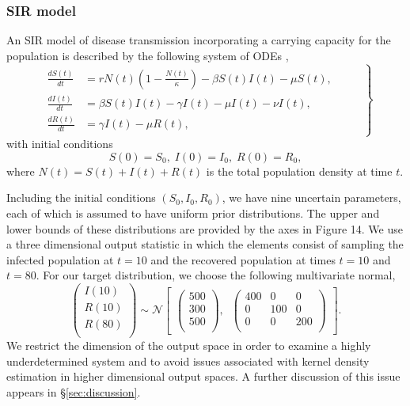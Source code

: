 \documentclass[10pt,letterpaper]{article}
\begin{document}
\vspace{0.5cm}

\subsubsection{SIR model}
\label{sec:SIR}

An SIR model of disease transmission incorporating a carrying capacity for the population is described by the following system of ODEs \cite{tavener2011transient},
%
\begin{equation}
\left .
\begin{gathered}\begin{aligned}
\frac{dS(t)}{dt} &= r N(t) \left(1 - \frac{N(t)}{\kappa}\right) - \beta S(t) I(t) - \mu S(t),\\
\frac{dI(t)}{dt} &= \beta S(t) I(t) - \gamma I(t) - \mu I(t) - \nu I(t),\\
\frac{dR(t)}{dt} &= \gamma I(t) - \mu R(t),
\end{aligned}\end{gathered}
\qquad \right\}
\end{equation}
with initial conditions
\begin{equation}
S(0)= S_0, \; I(0)=I_0, \; R(0)=R_0,
\end{equation}
%
where $N(t) = S(t) + I(t) + R(t)$ is the total population density at time $t$.

Including the initial conditions $(S_0,I_0,R_0)$, we have nine uncertain parameters, each of which is assumed to have uniform prior distributions. The upper and lower bounds of these distributions are provided by the axes in Figure 14. We use a three dimensional output statistic in which the elements consist of sampling the infected population at $t=10$ and the recovered population at times $t=10$ and $t=80$. For our target distribution, we choose the following multivariate normal,
%
\begin{equation}\label{eq:sir_outputDistribution}
\begin{pmatrix}I(10)\\
R(10)\\
R(80)\\
\end{pmatrix} \sim  \mathcal{N}
\begin{bmatrix}
\begin{pmatrix}
500\\
300\\
500\\
\end{pmatrix}, \;\;
\begin{pmatrix}
400 & 0 & 0\\
0 & 100 & 0\\
0 & 0 & 200\\
\end{pmatrix}
\end{bmatrix}.
\end{equation}
%
We restrict the dimension of the output space in order to examine a highly underdetermined system and to avoid issues associated with kernel density estimation in higher dimensional output spaces. A further discussion of this issue appears in \S \ref{sec:discussion}.
\end{document}
